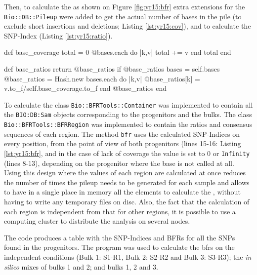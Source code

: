 Then, to calculate the  as shown on Figure \ref{fig:yr15:bfr} extra extensions for the \texttt{Bio::DB::Pileup} were added to get the actual number of bases in the pile (to exclude short insertions and deletions; Listing \ref{lst:yr15:cov}), and to calculate the SNP-Index (Listing \ref{lst:yr15:ratio}).  

\begin{code}[language=Ruby,caption=\texttt{base\_coverage} gets the number of bases called from a single pileup., label=lst:yr15:cov]
def base_coverage
  total = 0
  @bases.each do |k,v|
    total += v  
  end
  total
end
\end{code}

\begin{code}[language=Ruby,caption=\texttt{base\_ratios} gets the SNP-Index on a single pileup., label=lst:yr15:ratio]
def base_ratios
  return @base_ratios if @base_ratios
  bases = self.bases
  @base_ratios = Hash.new
  bases.each do |k,v| 
    @base_ratios[k] = v.to_f/self.base_coverage.to_f 
  end
  @base_ratios
 end
\end{code}

To calculate  the class \texttt{Bio::BFRTools::Container} was implemented to contain all the \texttt{BIO:DB:Sam} objects corresponding to the progenitors and the bulks. 
The class \texttt{Bio::BFRTools::BFRRegion}  was implemented to contain the ratios and consensus sequences of each region. 
The method \texttt{bfr} uses the calculated SNP-Indices on every position, from the point of view of both progenitors (lines 15-16: Listing \ref{lst:yr15:bfr}, and in the case of lack of coverage the value is set to 0 or \texttt{Infinity} (lines 8-13), depending on the progenitor where the base is not called at all. 
Using this design where the values of each region are calculated at once reduces the number of times the pileup needs to be generated for each sample and allows to have in a single place in memory all the elements to calculate the , without having to write any temporary files on disc. 
Also, the fact that the calculation of each region is independent from that for other regions, it is possible to use a computing cluster to distribute the analysis on several nodes.

The code produces a table with the SNP-Indices and BFRs for all the SNPs found in the progenitors. 
The program was used to calculate the \glspl{bfr} on the independent conditions (Bulk 1: S1-R1, Bulk 2: S2-R2 and Bulk 3: S3-R3); the \textit{in silico} mixes of bulks 1 and 2; and bulks 1, 2 and 3. 


